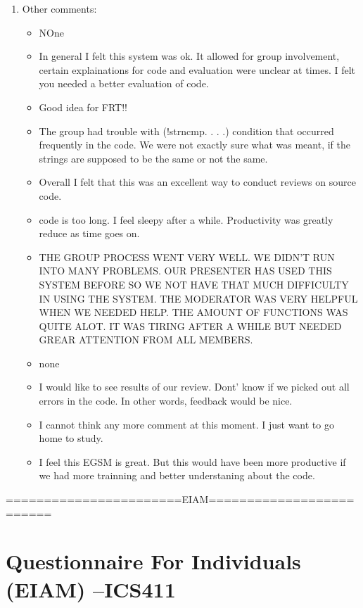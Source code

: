 \begin{enumerate}
\item Other comments:
\begin{itemize}
\item NOne
\item In general I felt this system was ok.  It allowed for group
involvement, certain explainations for code and evaluation were
unclear at times.  I felt you needed a better evaluation of code.
\item Good idea for FRT!!
\item The group had trouble with (!strncmp. . . .) condition that occurred
frequently in the code.  We were not exactly sure what was meant, if
the strings are supposed to be the same or not the same.
\item Overall I felt that this was an excellent way to conduct reviews on
source code.

\item code is too long.  I feel sleepy after a while.  Productivity was
greatly reduce as time goes on.
\item THE GROUP PROCESS WENT VERY WELL.  WE DIDN'T RUN INTO MANY PROBLEMS.
OUR PRESENTER HAS USED THIS SYSTEM BEFORE SO WE NOT HAVE THAT MUCH
DIFFICULTY IN USING THE SYSTEM.  THE MODERATOR WAS VERY HELPFUL WHEN
WE NEEDED HELP.  THE AMOUNT OF FUNCTIONS WAS QUITE ALOT.  IT WAS
TIRING AFTER A WHILE BUT NEEDED GREAR ATTENTION FROM ALL MEMBERS.
\item none

\item I would like to see results of our review.  Dont' know if
we picked out all errors in the code.  In other words, feedback
would be nice.
\item I cannot think any more comment at this moment.  I just want to go
home to study.
\item I feel this EGSM is great.
But this would have been more productive if we had
more trainning and better understaning about the code.

\end{itemize}

\end{enumerate}


=======================EIAM=========================

\chapter {Questionnaire For Individuals (EIAM) --ICS411}


